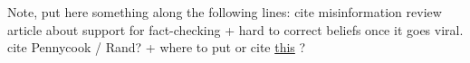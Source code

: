 \documentclass{article}
\begin{document}
\smallskip

{\color{pink} Note, put here something along the following lines: cite misinformation review article about support for fact-checking + hard to correct beliefs once it goes viral. cite Pennycook / Rand? + where to put or cite \href{https://www.poynter.org/ifcn/anti-misinformation-actions/}{this} ? }
 
\smallskip
\end{document}
